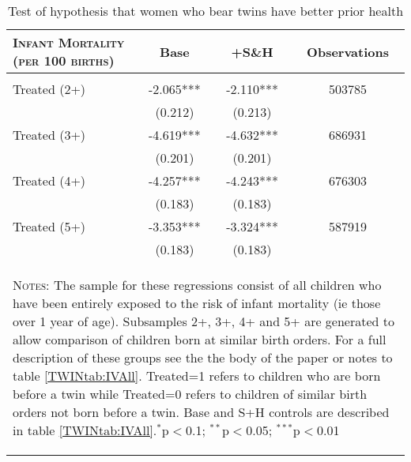 \begin{table}[htpb!]
\caption{Test of hypothesis that women who bear twins have better prior health}\label{TWINtab:IMR}\begin{center}\begin{tabular}{lccc}
\toprule \toprule 
\textsc{Infant Mortality (per 100 births)}& Base & +S\&H & Observations \\ \midrule 
\begin{footnotesize}\end{footnotesize}& 
\begin{footnotesize}\end{footnotesize}& 
\begin{footnotesize}\end{footnotesize}& 
\begin{footnotesize}\end{footnotesize}\\ 
Treated (2+)\hspace{5mm}\hspace{5mm}\hspace{5mm}\hspace{5mm}\hspace{5mm}\hspace{5mm}&-2.065***&-2.110***&503785\\
&(0.212)&(0.213)&\\
Treated (3+)\hspace{5mm}&-4.619***&-4.632***&686931\\
&(0.201)&(0.201)&\\
Treated (4+)&-4.257***&-4.243***&676303\\
&(0.183)&(0.183)&\\
Treated (5+)&-3.353***&-3.324***&587919\\
&(0.183)&(0.183)&\\
\midrule\multicolumn{4}{p{12.1cm}}{\begin{footnotesize}\textsc{Notes:} The sample for these regressions consist of all children who have been entirely exposed to the risk of infant mortality (ie those over 1 year of age). Subsamples 2+, 3+, 4+ and 5+ are generated to allow comparison of children born at similar birth orders.  For a full description of these groups see the the body of the paper or notes to table \ref{TWINtab:IVAll}. Treated=1 refers to children who are born before a twin while Treated=0 refers to children of similar birth orders not born before a twin.  Base and S+H controls are described in table \ref{TWINtab:IVAll}.$^{*}$p$<$0.1; $^{**}$p$<$0.05; $^{***}$p$<$0.01 
\end{footnotesize}} \\ \bottomrule 
\end{tabular}\end{center}\end{table}